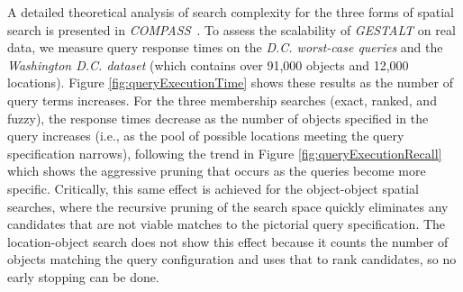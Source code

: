 A detailed theoretical analysis of search complexity for the three forms of spatial search is presented in \emph{COMPASS}~\cite{Osul2023}.
To assess the scalability of \emph{GESTALT} on real data, we measure query response times on the \textit{D.C. worst-case queries} and the \textit{Washington D.C. dataset} (which contains over 91,000 objects and 12,000 locations).
Figure \ref{fig:queryExecutionTime} shows these results as the number of query terms increases. 
For the three membership searches (exact, ranked, and fuzzy), the response times decrease as the number of objects specified in the query increases (i.e., as the pool of possible locations meeting the query specification narrows), following the trend in Figure \ref{fig:queryExecutionRecall} which shows the aggressive pruning that occurs as the queries become more specific.
Critically, this same effect is achieved for the object-object spatial searches, where the recursive pruning of the search space quickly eliminates any candidates that are not viable matches to the pictorial query specification.
The location-object search does not show this effect because it counts the number of objects matching the query configuration and uses that to rank candidates, so no early stopping can be done. 









